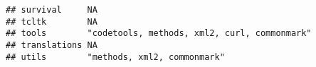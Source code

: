 \documentclass[]{article}
\begin{document}
\begin{verbatim}
## survival     NA                                                                                                                                                                                                                                                                                                                                                                                                                                                                                                                                                                                        
## tcltk        NA                                                                                                                                                                                                                                                                                                                                                                                                                                                                                                                                                                                        
## tools        "codetools, methods, xml2, curl, commonmark"                                                                                                                                                                                                                                                                                                                                                                                                                                                                                                                                              
## translations NA                                                                                                                                                                                                                                                                                                                                                                                                                                                                                                                                                                                        
## utils        "methods, xml2, commonmark"                                                                                                                                                                                                                                                                                                                                                                                                                                                                                                                                                               

\end{verbatim}
\end{document}
